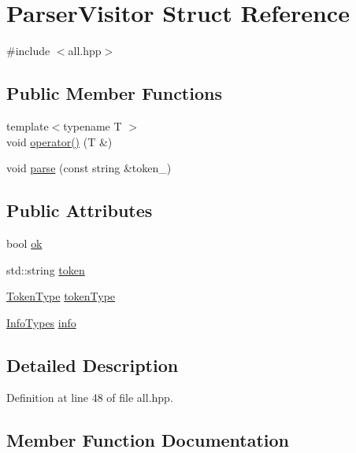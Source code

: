 \hypertarget{struct_parser_visitor}{}\section{Parser\+Visitor Struct Reference}
\label{struct_parser_visitor}


{\ttfamily \#include $<$all.\+hpp$>$}

\subsection*{Public Member Functions}
\begin{DoxyCompactItemize}
\item 
{\footnotesize template$<$typename T $>$ }\\void \hyperlink{struct_parser_visitor_aa5a5df33bf6193a75c72eb2eeb492429}{operator()} (T \&)
\item 
void \hyperlink{struct_parser_visitor_a241c6d04c5a0e736ee477d5d93af8ac7}{parse} (const string \&token\+\_\+)
\end{DoxyCompactItemize}
\subsection*{Public Attributes}
\begin{DoxyCompactItemize}
\item 
bool \hyperlink{struct_parser_visitor_af5c2d247a1ec646aded499e01ca71553}{ok}
\item 
std\+::string \hyperlink{struct_parser_visitor_a75c39e97645b48c171b9912440aa9ca2}{token}
\item 
\hyperlink{types_2arch_8hpp_aa520fbf142ba1e7e659590c07da31921}{Token\+Type} \hyperlink{struct_parser_visitor_acaa4d8ca1662ec314ae2a8f048f6aca3}{token\+Type}
\item 
\hyperlink{types_2all_8hpp_a58b4bafc5e94cba5e42b944a85b061db}{Info\+Types} \hyperlink{struct_parser_visitor_a44159efad79cb74d477675367d8dcc3f}{info}
\end{DoxyCompactItemize}


\subsection{Detailed Description}


Definition at line 48 of file all.\+hpp.



\subsection{Member Function Documentation}
\hypertarget{struct_parser_visitor_aa5a5df33bf6193a75c72eb2eeb492429}{}
